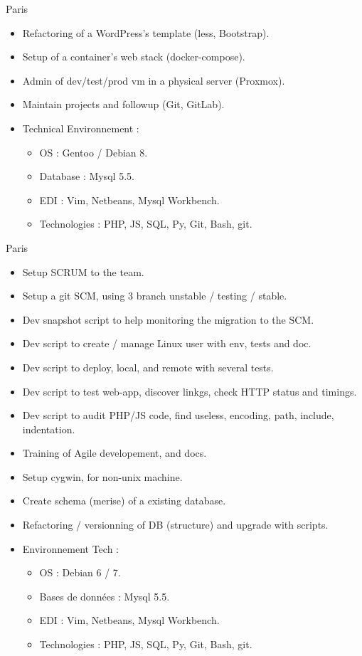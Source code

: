 \documentclass[10pt,a4paper,sans]{moderncv}
\begin{document}
{Paris}{
  \begin{itemize}%
    \item Refactoring of a WordPress's template (less, Bootstrap).
    \item Setup of a container's web stack (docker-compose).
    \item Admin of dev/test/prod vm in a physical server (Proxmox).
    \item Maintain projects and followup (Git, GitLab).
    \item Technical Environnement :
      \begin{itemize}%
        \item OS : Gentoo / Debian 8.
        \item Database : Mysql 5.5.
        \item EDI : Vim, Netbeans, Mysql Workbench.
        \item Technologies : PHP, JS, SQL, Py, Git, Bash, git.
      \end{itemize}
  \end{itemize}}

{Paris}{
  \begin{itemize}%
    \item Setup SCRUM to the team.
    \item Setup a git SCM, using 3 branch unstable / testing / stable.
    \item Dev snapshot script to help monitoring the migration to the SCM.
    \item Dev script to create / manage Linux user with env, tests and doc.
    \item Dev script to deploy, local, and remote with several tests.
    \item Dev script to test web-app, discover linkgs, check HTTP status and timings.
    \item Dev script to audit PHP/JS code, find useless, encoding, path, include, indentation.
    \item Training of Agile developement, and docs.
    \item Setup cygwin, for non-unix machine.
    \item Create schema (merise) of a existing database.
    \item Refactoring / versionning of DB (structure) and upgrade with scripts.
    \item Environnement Tech :
      \begin{itemize}%
        \item OS : Debian 6 / 7.
        \item Bases de données : Mysql 5.5.
        \item EDI : Vim, Netbeans, Mysql Workbench.
        \item Technologies : PHP, JS, SQL, Py, Git, Bash, git.
      \end{itemize}
  \end{itemize}}
\end{document}
